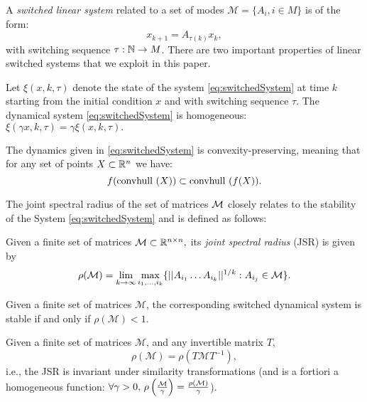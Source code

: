 A \emph{switched linear system} related to a set of modes $\mathcal{M}= \{A_i, i \in M \}$ is of the form:
\begin{equation}\label{eq:switchedSystem}x_{k+1} = A_{\tau(k)}x_k,\end{equation}
with switching sequence $\tau: \mathbb{N} \to M$. There are two important properties of linear switched systems that we exploit in this paper.
\begin{property}\label{property:homogeneity}
Let $\xi(x, k, \tau)$ denote the state of the system \eqref{eq:switchedSystem} at time $k$ starting from the initial condition $x$ and with switching sequence $\tau$. The dynamical system \eqref{eq:switchedSystem} is homogeneous: $\xi(\gamma x, k, \tau)= \gamma \xi(x, k, \tau).$
\end{property}
\begin{property}\label{property:convpres}
The dynamics given in \eqref{eq:switchedSystem} is convexity-preserving, meaning that for any set of points $X \subset \mathbb{R}^n$ we have:
$$ f(\mbox{convhull }({X}))\subset \mbox{convhull }(f(X)). $$
\end{property}

The joint spectral radius of the set of matrices $\mathcal{M}$ closely relates to the stability of the System \eqref{eq:switchedSystem} and is defined as follows:
\begin{definition} \cite{jungers_lncis} Given a finite set of matrices $\mathcal{M} \subset \mathbb{R}^{n\times n},$ its \emph{joint spectral radius} (JSR) is given by
$$\rho(\mathcal{M}) =\lim_{k\rightarrow \infty} \max_{i_1,\dots, i_k}\{||A_{i_1} \dots A_{i_k}||^{1/k}: A_{i_j}\in\mathcal{M}\}. $$
\end{definition}

\begin{property}
Given a finite set of matrices $\mathcal{M}$, the corresponding switched dynamical system is stable if and only if $\rho(\mathcal{M})<1$.
\end{property}

\begin{property}\label{rem:scaling}
Given a finite set of matrices $\mathcal{M}$, and any invertible matrix $T$, 
$$\rho(\mathcal{M})=\rho(T \mathcal{M} T^{-1}),$$
i.e., the JSR is invariant under similarity transformations (and is a fortiori a homogeneous function: $\forall \gamma > 0,\, \rho\left(\frac{\mathcal{M}}{\gamma}\right)=\frac{\rho(\mathcal{M})}{\gamma}$).
\end{property}

